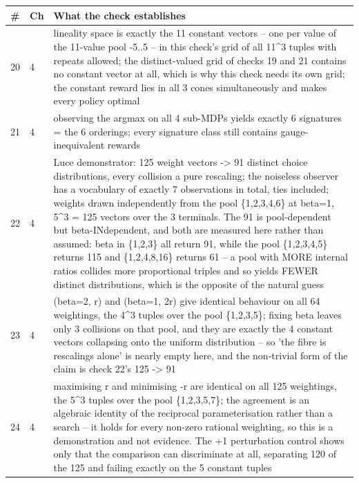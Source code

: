 \par\medskip
\noindent
\begin{tabularx}{\textwidth}{llX}
\toprule
\# & Ch & What the check establishes \\
\midrule
20 & 4 & lineality space is exactly the 11 constant vectors -- one per value of the 11-value pool -5..5 -- in this check's grid of all 11\textasciicircum{}3 tuples with repeats allowed; the distinct-valued grid of checks 19 and 21 contains no constant vector at all, which is why this check needs its own grid; the constant reward lies in all 3 cones simultaneously and makes every policy optimal \\
21 & 4 & observing the argmax on all 4 sub-MDPs yields exactly 6 signatures = the 6 orderings; every signature class still contains gauge-inequivalent rewards \\
22 & 4 & Luce demonstrator: 125 weight vectors -> 91 distinct choice distributions, every collision a pure rescaling; the noiseless observer has a vocabulary of exactly 7 observations in total, ties included; weights drawn independently from the pool \{1,2,3,4,6\} at beta=1, 5\textasciicircum{}3 = 125 vectors over the 3 terminals. The 91 is pool-dependent but beta-INdependent, and both are measured here rather than assumed: beta in \{1,2,3\} all return 91, while the pool \{1,2,3,4,5\} returns 115 and \{1,2,4,8,16\} returns 61 -- a pool with MORE internal ratios collides more proportional triples and so yields FEWER distinct distributions, which is the opposite of the natural guess \\
23 & 4 & (beta=2, r) and (beta=1, 2r) give identical behaviour on all 64 weightings, the 4\textasciicircum{}3 tuples over the pool \{1,2,3,5\}; fixing beta leaves only 3 collisions on that pool, and they are exactly the 4 constant vectors collapsing onto the uniform distribution -- so 'the fibre is rescalings alone' is nearly empty here, and the non-trivial form of the claim is check 22's 125 -> 91 \\
24 & 4 & maximising r and minimising -r are identical on all 125 weightings, the 5\textasciicircum{}3 tuples over the pool \{1,2,3,5,7\}; the agreement is an algebraic identity of the reciprocal parameterisation rather than a search -- it holds for every non-zero rational weighting, so this is a demonstration and not evidence. The +1 perturbation control shows only that the comparison can discriminate at all, separating 120 of the 125 and failing exactly on the 5 constant tuples \\
\bottomrule
\end{tabularx}
